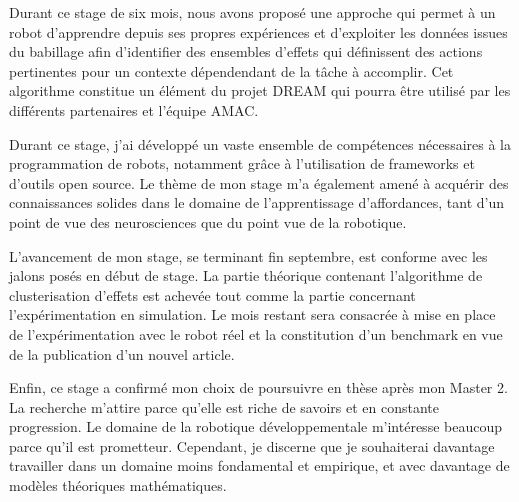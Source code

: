 \documentclass[draft]{llncs}
\begin{document}
Durant ce stage de six mois, nous avons proposé une approche qui permet à un robot d'apprendre depuis ses propres expériences et d'exploiter les données issues du babillage afin d'identifier des ensembles d'effets qui définissent des actions pertinentes pour un contexte dépendendant de la tâche à accomplir.
Cet algorithme constitue un élément du projet DREAM qui pourra être utilisé par les différents partenaires et l'équipe AMAC.

Durant ce stage, j'ai développé un vaste ensemble de compétences nécessaires à la programmation de robots, notamment grâce à l'utilisation de frameworks et d'outils open source.
Le thème de mon stage m'a également amené à acquérir des connaissances solides dans le domaine de l'apprentissage d'affordances, tant d'un point de vue des neurosciences que du point vue de la robotique.

L'avancement de mon stage, se terminant fin septembre, est conforme avec les jalons posés en début de stage.
La partie théorique contenant l'algorithme de clusterisation d'effets est achevée tout comme la partie concernant l'expérimentation en simulation.
Le mois restant sera consacrée à mise en place de l'expérimentation avec le robot réel et la constitution d'un benchmark en vue de la publication d'un nouvel article.

Enfin, ce stage a confirmé mon choix de poursuivre en thèse après mon Master 2.
La recherche m'attire parce qu'elle est riche de savoirs et en constante progression.
Le domaine de la robotique développementale m'intéresse beaucoup parce qu'il est prometteur.
Cependant, je discerne que je souhaiterai davantage travailler dans un domaine moins fondamental et empirique, et avec davantage de modèles théoriques mathématiques.




\end{document}
